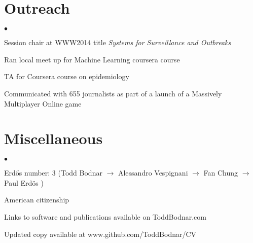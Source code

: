 \documentclass[margin,line]{res}
\newenvironment{list2}{
  \begin{list}{$\bullet$}{%
      \setlength{\itemsep}{0in}
      \setlength{\parsep}{0in} \setlength{\parskip}{0in}
      \setlength{\topsep}{0in} \setlength{\partopsep}{0in} 
      \setlength{\leftmargin}{10pt}}}{\end{list}}
\begin{document}
\begin{resume}
\section{\sc Outreach}
\begin{list2}
\item Session chair at WWW2014 title \emph{Systems for Surveillance and Outbreaks}
\item Ran local meet up for Machine Learning coursera course
\item TA for Coursera course on epidemiology
\item Communicated with 655 journalists as part of a launch of a Massively Multiplayer Online game
\end{list2}


\section{\sc Miscellaneous}
\begin{list2}
\item Erd\H{o}s number: 3 (Todd Bodnar \(\rightarrow\) Alessandro Vespignani \(\rightarrow\) Fan Chung \(\rightarrow\) Paul Erd\"os )
\item American citizenship
\item Links to software and publications available on ToddBodnar.com
\item Updated copy available at www.github.com/ToddBodnar/CV
\end{list2}


\end{resume}
\end{document}
